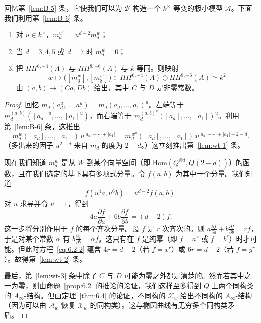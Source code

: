 回忆第~\ref{lem:B-5} 条，它使我们可以为 $\mathcal{B}$ 构造一个 $k^{\times}$-等变的极小模型 $\mathcal{A}$。下面我们利用第~\ref{lem:B-6} 条。

\begin{lemma*}\label{lem:weights}
\begin{enumerate}
  \item\label{lem:wt-1} 对 $u\in k^{\times}$，$m_d^{w^u}=u^{d-2}m_d^w$；
  \item\label{lem:wt-2} 当 $d=3,4,5$ 或 $d=7$ 时 $m_d^w=0$；
  \item\label{lem:wt-3} 把 $HH^{6,-4}(A)$ 与 $HH^{8,-6}(A)$ 与 $k$ 等同。则映射
  \[
  w\longmapsto\bigl([m_6^w],[m_8^w]\bigr)\in HH^{6,-4}(A)\oplus HH^{8,-6}(A)\simeq k^2
  \]
  由 $(a,b)\mapsto(Ca,Db)$ 给出，其中 $C$ 与 $D$ 是非零常数。
\end{enumerate}
\end{lemma*}

\begin{proof}
回忆 $m_d(a_d^u,\ldots,a_1^u)=m_d(a_d,\ldots,a_1)^u$。左端等于 $m_d^{(a,b)}([a_d]^u,\ldots,[a_1]^u)$，而右端等于 $m_d^{(a,b)^u}([a_d],\ldots,[a_1])^u$。利用第~\ref{lem:B-6} 条，这推出
\[
m_d^w([a_d],\ldots,[a_1])\,u^{|a_d|+\cdots+|a_1|}
=m_d^{w^u}([a_d],\ldots,[a_1])\,u^{|a_d|+\cdots+|a_1|+2-d}.
\]
（多出来的因子 $u^{2-d}$ 来自 $m_d$ 的度为 $2-d$。）这立刻推出第~\ref{lem:wt-1} 条。

现在我们知道 $m_d^w$ 是从 $W$ 到某个向量空间（即 $\mathrm{Hom}(Q^{\otimes d},Q(2-d))$）的函数，且在我们选定的基下具有多项式分量。令 $f(a,b)$ 为其中一个分量。我们知道
\[
f(u^4a,u^6b)=u^{d-2}f(a,b).
\]
对 $u$ 求导并令 $u=1$，得到
\begin{equation}\label{eq:6.2-2}
4a\frac{\partial f}{\partial a}+6b\frac{\partial f}{\partial b}=(d-2)f.
\end{equation}
这一步将分别作用于 $f$ 的每个齐次分量。设 $f$ 是 $r$ 次齐次的。则 $a\frac{\partial f}{\partial a}+b\frac{\partial f}{\partial b}=rf$，于是对某个常数 $\alpha$ 有 $b\frac{\partial f}{\partial b}=\alpha f$。这只有在 $f$ 是纯幂（即 $f=a^r$ 或 $f=b^r$）时才可能。但此时方程~\eqref{eq:6.2-2} 蕴含 $4r=d-2$（若 $f=x^r$）或 $6r=d-2$（若 $f=y^r$）。故得第~\ref{lem:wt-2} 条。

最后，第~\ref{lem:wt-3} 条中除了 $C$ 与 $D$ 可能为零之外都是清楚的。然而若其中之一为零，则由命题~\ref{prop:6.2} 的推论的论证，我们这样至多得到 $Q$ 上两个同构类的 $A_\infty$-结构。但由定理~\ref{thm:6.4} 的论证，不同构的 $\mathcal{X}_w$ 给出不同构的 $A_\infty$-结构（因为可以由 $\mathcal{A}_w$ 恢复 $\mathcal{X}_w$ 的同构类）。这与椭圆曲线有无穷多个同构类矛盾。
\end{proof}

